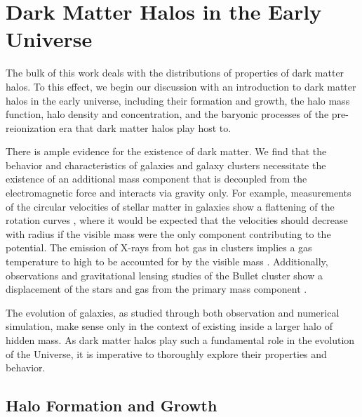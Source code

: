 
%
%

\section{Dark Matter Halos in the Early Universe}
\label{sec:early_universe}



The bulk of this work deals with the distributions of properties of dark matter halos.  To this effect, we begin our discussion with an introduction to dark matter halos in the early universe, including their formation and growth, the halo mass function, halo density and concentration, and the baryonic processes of the pre-reionization era that dark matter halos play host to.

There is ample evidence for the existence of dark matter.  We find that the behavior and characteristics of galaxies and galaxy clusters necessitate the existence of an additional mass component that is decoupled from the electromagnetic force and interacts via gravity only.  For example, measurements of the circular velocities of stellar matter in galaxies show a flattening of the rotation curves \citep{1980ApJ...238..471R}, where it would be expected that the velocities should decrease with radius if the visible mass were the only component contributing to the potential.  The emission of X-rays from hot gas in clusters implies a gas temperature to high to be accounted for by the visible mass \citep{2006ApJ...640..691V}.  Additionally, observations and gravitational lensing studies of the Bullet cluster show a displacement of the stars and gas from the primary mass component \citep{2006ApJ...648L.109C}.

The evolution of galaxies, as studied through both observation and numerical simulation, make sense only in the context of existing inside a larger halo of hidden mass.  As dark matter halos play such a fundamental role in the evolution of the Universe, it is imperative to thoroughly explore their properties and behavior.




\subsection{Halo Formation and Growth}
\label{subsec:early_universe--formation_and_growth}


